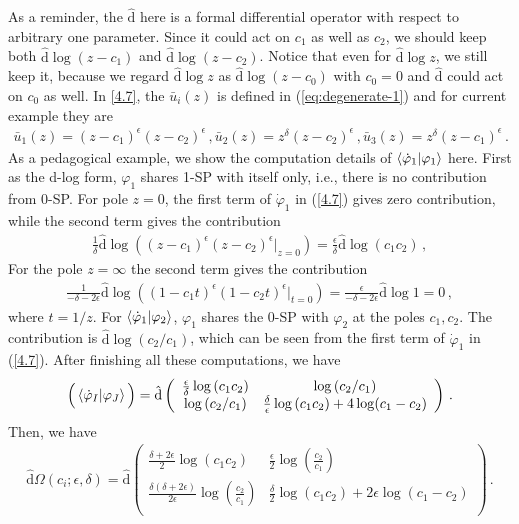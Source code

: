 \documentclass[a4paper,11pt]{article}
\newcommand{\nds}{\hat{\mathrm{d}}}
\newcommand{\ep}{\epsilon}
\newcommand{\bea}{\begin{eqnarray}}
\newcommand{\eea}{\end{eqnarray}}
\def\eref#1{(\ref{#1})}
\begin{document}
As a reminder, the $\nds$ here is a formal differential operator with respect to arbitrary one parameter. Since it could act on $c_1$ as well as  $c_2$, we should keep both $\nds \log (z-c_1)$ and $\nds \log (z-c_2)$. Notice that even for $\nds \log z$, we still keep it, because  we regard $\nds \log z$ as $\nds \log (z-c_0)$ with $c_0=0$ and $\nds$ could act on $c_0$ as well.
In \eqref{4.7}, the $\bar{u}_i(z)$ is defined in \eref{eq:degenerate-1} and for current example they are 
%
\bea 
\bar{u}_1(z) = (z-c_1)^\ep(z-c_2)^\ep \, ,  
\bar{u}_2(z) = z^\delta(z-c_2)^\ep \, ,
\bar{u}_3(z) = z^\delta(z-c_1)^\ep \, . 
\eea
As a pedagogical example, we show the computation details of  $\braket{\dot{\varphi}_1|\varphi_1}$ here. 
First as the d-log form, $\varphi_1$ shares 1-SP with itself only, i.e., there is no contribution from 
0-SP. For 
pole $z=0$, the first term of $\dot{\varphi}_1$ in \eref{4.7}  gives zero contribution, while the second term gives the contribution
\begin{align}
\frac{1}{\delta} \nds \log \left((z-c_1)^\ep(z-c_2)^\ep|_{z=0} \right) = \frac{\ep}{\delta} \nds \log(c_1c_2)  \,,
\end{align}
For the pole $z=\infty$ the second term gives the contribution
\begin{align}
\frac{1}{-\delta-2\ep} \nds \log \left((1-c_1 t)^\ep(1-c_2 t)^\ep|_{t=0} \right) = \frac{\ep}{-\delta-2\ep} \nds \log 1 = 0 \,,
\end{align}
where $t=1/z$. %
For $\braket{\dot{\varphi}_1|\varphi_2}$, $\varphi_1$ shares the 0-SP with $\varphi_2$ at the poles $c_1,c_2$. The contribution is $\nds \log
\left(c_2/c_1\right) $, which   can be seen from the first term  of $\dot{\varphi}_1$ in \eref{4.7}. After finishing all these computations,  we have 
\begin{align}
\Big( \braket{\dot{\varphi}_I|\varphi_J} \Big) = \nds \left(
\begin{array}{cc}
 \frac{\epsilon }{\delta } \log \left(c_1c_2\right) & \log
   \left(c_2/c_1\right) \\
 \log \left(c_2/c_1\right) & \frac{\delta }{\epsilon } \log \left(c_1c_2\right) + 4\log(c_1-c_2) \\
\end{array}
\right)  \, .
\end{align}
Then, we have
\begin{align}
\nds \Omega (c_i;\ep,\delta) = \nds \left(
\begin{array}{cc}
 \frac{\delta +2 \ep}{2} \log \left(c_1 c_2\right)& \frac{\epsilon}{2}   \log \left(\frac{c_2}{c_1}\right) \\
 \frac{\delta   (\delta +2 \epsilon )}{2 \epsilon } \log \left(\frac{c_2}{c_1}\right) 
 & \frac{\delta}{2}   \log \left(c_1 c_2\right)+2 \epsilon  \log \left(c_1-c_2\right) \\
\end{array}
\right)   \, . \label{eq:1varDEreg}
\end{align}
\end{document}
